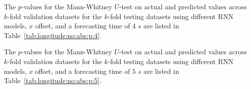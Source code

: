 The $p$-values for the Mann-Whitney $U$-test on actual and predicted values across $k$-fold validation datasets for the $k$-fold testing datasets using different RNN models, $x$ offset, and a forecasting time of $4$ $s$ are listed in Table~\ref{tab:longitude:no:abs:p:4}.

\begin{table}[!ht]
	\centering
	\caption{The $p$-values for the Mann-Whitney $U$-test on actual and predicted values across $k$-fold validation datasets for the $k$-fold testing datasets using different RNN models, $x$ offset, and a forecasting time of $4$ $s$.}
	\label{tab:longitude:no:abs:p:4}
\end{table}

The $p$-values for the Mann-Whitney $U$-test on actual and predicted values across $k$-fold validation datasets for the $k$-fold testing datasets using different RNN models, $x$ offset, and a forecasting time of $5$ $s$ are listed in Table~\ref{tab:longitude:no:abs:p:5}.


